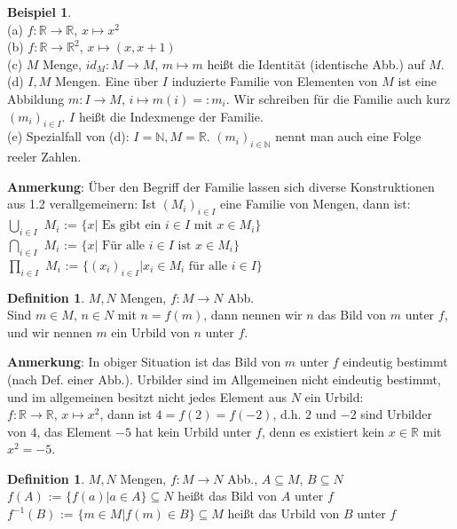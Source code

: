 \documentclass[10pt,a4paper,numbers=endperiod]{scrartcl}
\theoremstyle{definition}
\newtheorem{defi}[satz]{Definition}
\newtheorem{bsp}[satz]{Beispiel}
\begin{document}
\begin{bsp}
	$ $\\
	(a) $f: \mathbb{R} \rightarrow \mathbb{R}$, $x \mapsto x^{2}$\\
	(b) $f: \mathbb{R} \rightarrow \mathbb{R}^{2}$, $x \mapsto (x,x+1)$\\
	(c) $M$ Menge, $id_M: M \rightarrow M$, $m \mapsto m$ heißt die Identität (identische Abb.) auf $M$.\\
	(d) $I,M$ Mengen. Eine über $I$ induzierte Familie von Elementen von $M$ ist eine Abbildung $m: I \rightarrow M$, $i \mapsto m(i) =: m_i$. Wir schreiben für die Familie auch kurz $(m_i)_{i \in I}$. $I$ heißt die Indexmenge der Familie.\\
	(e) Spezialfall von (d): $I = \mathbb{N}, M = \mathbb{R}$. $(m_i)_{i \in \mathbb{N}}$ nennt man auch eine Folge reeler Zahlen.
\end{bsp}
\textbf{Anmerkung}: Über den Begriff der Familie lassen sich diverse Konstruktionen aus 1.2 verallgemeinern: Ist $(M_i)_{i \in I}$ eine Familie von Mengen, dann ist:\\
$\bigcup\limits_{i \in I}$ $M_i$ := $\{x|\text{ Es gibt ein } i \in I \text{ mit } x \in M_i\}$\\
$\bigcap\limits_{i \in I}$ $M_i$ := $\{x|\text{ Für alle } i \in I \text{ ist } x \in M_i\}$\\
$\prod\limits_{i \in I}$ $M_i$ := $\{(x_i)_{i \in I}| x_i \in M_i \text{ für alle } i \in I\}$

\begin{defi}
	$M,N$ Mengen, $f: M \rightarrow N$ Abb.\\
	Sind $m \in M$, $n \in N$ mit $n=f(m)$, dann nennen wir $n$ das Bild von $m$ unter $f$, und wir nennen $m$ ein Urbild von $n$ unter $f$.
\end{defi}
\textbf{Anmerkung}: In obiger Situation ist das Bild von $m$ unter $f$ eindeutig bestimmt (nach Def. einer Abb.). Urbilder sind im Allgemeinen nicht eindeutig bestimmt, und im allgemeinen  besitzt nicht jedes Element aus $N$ ein Urbild:\\
$f: \mathbb{R} \rightarrow \mathbb{R}$, $x \mapsto x^{2}$, dann ist $4=f(2)=f(-2)$, d.h. $2$ und $-2$ sind Urbilder von $4$, das Element $-5$ hat kein Urbild unter $f$, denn es existiert kein $x \in \mathbb{R}$ mit $x^{2} = -5$.

\begin{defi}
	$M,N$ Mengen, $f: M \rightarrow N$ Abb., $A \subseteq M$, $B \subseteq N$\\
	$f(A)$ := $\{f(a)|a \in A\} \subseteq N$ heißt das Bild von $A$ unter $f$\\
	$f^{-1}(B)$ := $\{m \in M| f(m) \in B\} \subseteq M$ heißt das Urbild von $B$ unter $f$
\end{defi}
\end{document}
